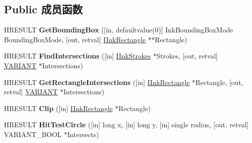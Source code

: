 \subsection*{Public 成员函数}
\begin{DoxyCompactItemize}
\item 
\mbox{\label{interface_m_s_i_n_k_a_u_t_lib_1_1_i_ink_stroke_disp_abb163c53dad952bbda0dbfacbc2a1db5}} 
H\+R\+E\+S\+U\+LT {\bfseries Get\+Bounding\+Box} (\mbox{[}in, defaultvalue(0)\mbox{]} Ink\+Bounding\+Box\+Mode Bounding\+Box\+Mode, \mbox{[}out, retval\mbox{]} \hyperlink{interface_m_s_i_n_k_a_u_t_lib_1_1_i_ink_rectangle}{I\+Ink\+Rectangle} $\ast$$\ast$Rectangle)
\item 
\mbox{\label{interface_m_s_i_n_k_a_u_t_lib_1_1_i_ink_stroke_disp_aa3107163739f4aa6b8086fdaca60c18c}} 
H\+R\+E\+S\+U\+LT {\bfseries Find\+Intersections} (\mbox{[}in\mbox{]} \hyperlink{interface_m_s_i_n_k_a_u_t_lib_1_1_i_ink_strokes}{I\+Ink\+Strokes} $\ast$Strokes, \mbox{[}out, retval\mbox{]} \hyperlink{structtag_v_a_r_i_a_n_t}{V\+A\+R\+I\+A\+NT} $\ast$Intersections)
\item 
\mbox{\label{interface_m_s_i_n_k_a_u_t_lib_1_1_i_ink_stroke_disp_a4e933c25cabed5be312d20ec4c6febb3}} 
H\+R\+E\+S\+U\+LT {\bfseries Get\+Rectangle\+Intersections} (\mbox{[}in\mbox{]} \hyperlink{interface_m_s_i_n_k_a_u_t_lib_1_1_i_ink_rectangle}{I\+Ink\+Rectangle} $\ast$Rectangle, \mbox{[}out, retval\mbox{]} \hyperlink{structtag_v_a_r_i_a_n_t}{V\+A\+R\+I\+A\+NT} $\ast$Intersections)
\item 
\mbox{\label{interface_m_s_i_n_k_a_u_t_lib_1_1_i_ink_stroke_disp_a25ff61180d1e1c0a9cb3cc6c7891f972}} 
H\+R\+E\+S\+U\+LT {\bfseries Clip} (\mbox{[}in\mbox{]} \hyperlink{interface_m_s_i_n_k_a_u_t_lib_1_1_i_ink_rectangle}{I\+Ink\+Rectangle} $\ast$Rectangle)
\item 
\mbox{\label{interface_m_s_i_n_k_a_u_t_lib_1_1_i_ink_stroke_disp_a11f0043df3f16bda48f5b443e32c8fe2}} 
H\+R\+E\+S\+U\+LT {\bfseries Hit\+Test\+Circle} (\mbox{[}in\mbox{]} long x, \mbox{[}in\mbox{]} long y, \mbox{[}in\mbox{]} single radius, \mbox{[}out, retval\mbox{]} V\+A\+R\+I\+A\+N\+T\+\_\+\+B\+O\+OL $\ast$Intersects)
$$
\end{DoxyCompactItemize}
